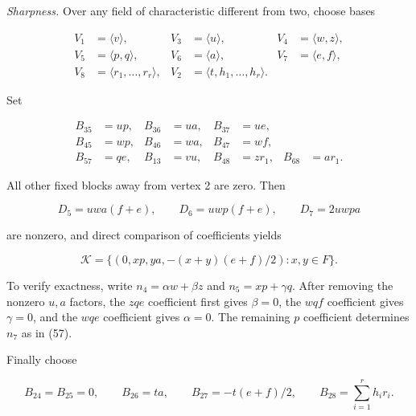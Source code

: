 \documentclass[11pt]{article}
\begin{document}
\emph{Sharpness.} Over any field of characteristic different from two, choose bases


\nopagebreak[4]

\begin{equation}
\begin{aligned}
V_1&=\langle v\rangle,&V_3&=\langle u\rangle,&V_4&=\langle w,z\rangle,\\
V_5&=\langle p,q\rangle,&V_6&=\langle a\rangle,&V_7&=\langle e,f\rangle,\\
V_8&=\langle r_1,\ldots,r_r\rangle,&
V_2&=\langle t,h_1,\ldots,h_r\rangle.
\end{aligned}
\tag{54}
\end{equation}

Set


\nopagebreak[4]

\begin{equation}
\begin{aligned}
B_{35}&=up,&B_{36}&=ua,&B_{37}&=ue,\\
B_{45}&=wp,&B_{46}&=wa,&B_{47}&=wf,\\
B_{57}&=qe,&B_{13}&=vu,&B_{48}&=zr_1,&B_{68}&=ar_1.
\end{aligned}
\tag{55}
\end{equation}

All other fixed blocks away from vertex 2 are zero. Then


\nopagebreak[4]

\begin{equation}
D_5=uw a(f+e),\qquad D_6=uw p(f+e),\qquad D_7=2uwpa
\tag{56}
\end{equation}

are nonzero, and direct comparison of coefficients yields


\nopagebreak[4]

\begin{equation}
\mathcal K=\{(0,xp,ya,-(x+y)(e+f)/2):x,y\in F\}.
\tag{57}
\end{equation}

To verify exactness, write $n_4=\alpha w+\beta z$ and $n_5=xp+\gamma q$. After removing the nonzero $u,a$ factors, the $zqe$ coefficient first gives $\beta=0$, the $wqf$ coefficient gives $\gamma=0$, and the $wqe$ coefficient gives $\alpha=0$. The remaining $p$ coefficient determines $n_7$ as in (57).


Finally choose


\nopagebreak[4]

\begin{equation}
B_{24}=B_{25}=0,\qquad B_{26}=ta,\qquad
B_{27}=-t(e+f)/2,\qquad B_{28}=\sum_{i=1}^r h_ir_i.
\tag{58}
\end{equation}
\end{document}
